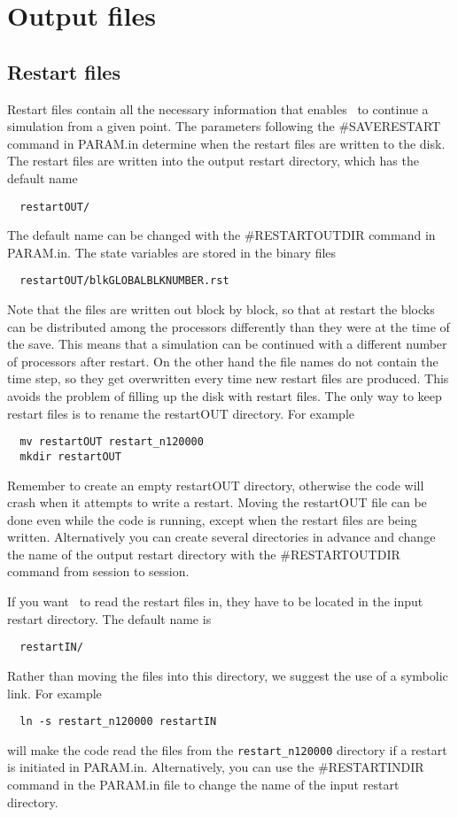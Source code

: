 \chapter{Output files \label{chapter:output}}

\section{Restart files \label{section:restart_output}}

Restart files contain all the necessary information that enables \BATSRUS\ 
to continue a simulation from a given point. The parameters following
the \#SAVERESTART command in PARAM.in determine when the restart files 
are written to the disk. The restart files are written into the 
output restart directory, which has the default name
\begin{verbatim}
  restartOUT/
\end{verbatim}
The default name can be changed with the \#RESTARTOUTDIR command in PARAM.in.
The state variables are stored in the binary files
\begin{verbatim}
  restartOUT/blkGLOBALBLKNUMBER.rst
\end{verbatim}
Note that the files are written out block by block, so that
at restart the blocks can be distributed among the processors differently
than they were at the time of the save. This means that a simulation
can be continued with a different number of processors after restart.
On the other hand the file names do not contain the time step, so they
get overwritten every time new restart files are produced. This avoids
the problem of filling up the disk with restart files. The only way to
keep restart files is to rename the restartOUT directory. For example
\begin{verbatim}
  mv restartOUT restart_n120000
  mkdir restartOUT
\end{verbatim}
Remember to create an empty restartOUT directory, otherwise the code will
crash when it attempts to write a restart. Moving the restartOUT file
can be done even while the code is running, except when the restart
files are being written. Alternatively you can create several directories
in advance and change the name of the output restart directory with
the \#RESTARTOUTDIR command from session to session.

If you want \BATSRUS\ to read the restart files in,
they have to be located in the input restart directory.
The default name is
\begin{verbatim}
  restartIN/
\end{verbatim}
Rather than moving the files into this directory, we suggest
the use of a symbolic link. For example
\begin{verbatim}
  ln -s restart_n120000 restartIN
\end{verbatim}
will make the code read the files from the {\tt restart\_n120000} directory
if a restart is initiated in PARAM.in.
Alternatively, you can use the \#RESTARTINDIR command in the PARAM.in file
to change the name of the input restart directory.

